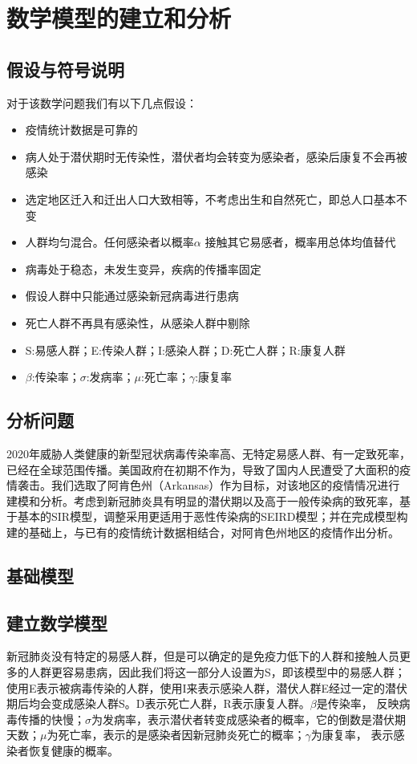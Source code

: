 \documentclass[withoutpreface,bwprint]{cumcmthesis} %
\begin{document}
\section{数学模型的建立和分析}
\subsection{假设与符号说明}
对于该数学问题我们有以下几点假设：
\begin{itemize}
    \item 疫情统计数据是可靠的
    \item 病人处于潜伏期时无传染性，潜伏者均会转变为感染者，感染后康复不会再被感染
    \item 选定地区迁入和迁出人口大致相等，不考虑出生和自然死亡，即总人口基本不变
    \item 人群均匀混合。任何感染者以概率$\alpha$ 接触其它易感者，概率用总体均值替代
    \item 病毒处于稳态，未发生变异，疾病的传播率固定
    \item 假设人群中只能通过感染新冠病毒进行患病
    \item 死亡人群不再具有感染性，从感染人群中剔除
    \item S:易感人群；E:传染人群；I:感染人群；D:死亡人群；R:康复人群
    \item $\beta$:传染率；$\sigma$:发病率；$\mu$:死亡率；$\gamma$:康复率
\end{itemize}

\subsection{分析问题}
2020年威胁人类健康的新型冠状病毒传染率高、无特定易感人群、有一定致死率，已经在全球范围传播。美国政府在初期不作为，导致了国内人民遭受了大面积的疫情袭击。我们选取了阿肯色州（Arkansas）作为目标，对该地区的疫情情况进行建模和分析。考虑到新冠肺炎具有明显的潜伏期以及高于一般传染病的致死率，基于基本的SIR模型，调整采用更适用于恶性传染病的SEIRD模型；并在完成模型构建的基础上，与已有的疫情统计数据相结合，对阿肯色州地区的疫情作出分析。
\subsection{基础模型}
\clearpage
\subsection{建立数学模型}
新冠肺炎没有特定的易感人群，但是可以确定的是免疫力低下的人群和接触人员更多的人群更容易患病，因此我们将这一部分人设置为S，即该模型中的易感人群；使用E表示被病毒传染的人群，使用I来表示感染人群，潜伏人群E经过一定的潜伏期后均会变成感染人群S。D表示死亡人群，R表示康复人群。$\beta$是传染率， 反映病毒传播的快慢；$\sigma$为发病率，表示潜伏者转变成感染者的概率，它的倒数是潜伏期天数；$\mu$为死亡率，表示的是感染者因新冠肺炎死亡的概率；$\gamma$为康复率， 表示感染者恢复健康的概率。
\end{document}
